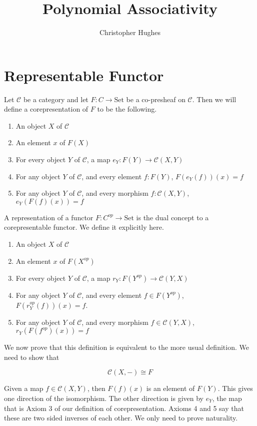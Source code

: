 \documentclass[12pt]{article} %
\title{Polynomial Associativity}
\author{Christopher Hughes}
\theoremstyle{definition}
\theoremstyle{definition}
\theoremstyle{definition}
\theoremstyle{definition}
\begin{document}
\section{Representable Functor}

Let $\mathcal{C}$ be a category and let $F : C \to \text{Set}$
be a co-presheaf on $\mathcal{C}$. Then we will define a corepresentation of
$F$ to be the following.

\begin{enumerate}
  \item An object $X$ of $\mathcal{C}$
  \item An element $x$ of $F(X)$
  \item For every object $Y$ of $\mathcal{C}$, a map $e_Y : F(Y) \to \mathcal{C}(X, Y)$
  \item For any object $Y$ of $\mathcal{C}$, and every element $f : F(Y)$, $F(e_Y(f))(x) = f$
  \item For any object $Y$ of $\mathcal{C}$, and every morphism $f : \mathcal{C}(X, Y)$,
    $e_Y(F(f)(x)) = f$
\end{enumerate}

A representation of a functor $F : C^{op} \to \text{Set}$ is the dual concept to a corepresentable
functor. We define it explicitly here.

\begin{enumerate}
  \item An object $X$ of $\mathcal{C}$
  \item An element $x$ of $F(X^{op})$
  \item For every object $Y$ of $\mathcal{C}$, a map $r_Y : F(Y^{op}) \to \mathcal{C}(Y, X)$
  \item For any object $Y$ of $\mathcal{C}$, and every element $f \in F(Y^{op})$, $F(r_Y^{op}(f))(x) = f$.
  \item For any object $Y$ of $\mathcal{C}$, and every morphism $f \in \mathcal{C}(Y, X)$,
  $r_Y(F(f^{op})(x)) = f$
\end{enumerate}

We now prove that this definition is equivalent to the more usual definition. We need to show that


\begin{equation}
\mathcal{C}(X, -) \cong F
\end{equation}

Given a map $f \in \mathcal{C}(X, Y)$, then $F(f)(x)$ is an element of $F(Y)$. This gives one 
direction of the isomorphism. The other direction is given by $e_Y$, the map that is
Axiom 3 of our definition of corepresentation. Axioms 4 and 5 say that these are two sided inverses
of each other. We only need to prove naturality.
\end{document}

